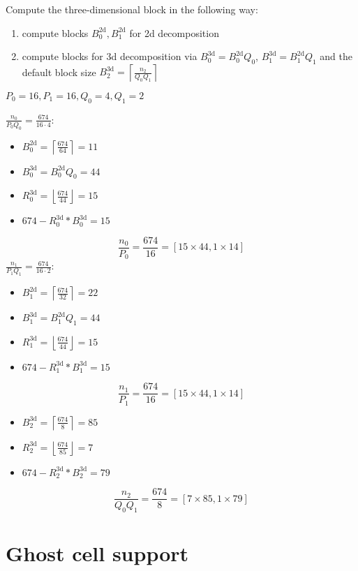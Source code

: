 Compute the three-dimensional block in the following way:
\begin{enumerate}
 \item compute blocks $B_0^\textrm{2d}, B_1^\textrm{2d}$ for 2d decomposition
 \item compute blocks for 3d decomposition via $B_0^\textrm{3d} = B_0^\textrm{2d} Q_0$, $B_1^\textrm{3d} = B_1^\textrm{2d} Q_1$ and the default block size $B_2^\textrm{3d} = \left\lceil\frac{n_2}{Q_0Q_1}\right\rceil$
\end{enumerate}


$P_0 = 16, P_1 = 16, Q_0=4, Q_1=2$

$\frac{n_0}{P_0Q_0} = \frac{674}{16\cdot 4}$:
\begin{itemize}
 \item $B_0^\textrm{2d} = \left\lceil \frac{674}{64} \right\rceil = 11$
 \item $B_0^\textrm{3d} = B_0^\textrm{2d}Q_0 = 44$
 \item $R_0^\textrm{3d} = \left\lfloor \frac{674}{44} \right\rfloor = 15$
 \item $674 - R_0^\textrm{3d}*B_0^\textrm{3d} = 15$
\end{itemize}
\begin{equation*}
  \frac{n_0}{P_0} = \frac{674}{16} = \left[15\times 44, 1\times 14 \right]
\end{equation*}
$\frac{n_1}{P_1Q_1} = \frac{674}{16\cdot 2}$:
\begin{itemize}
 \item $B_1^\textrm{2d} = \left\lceil \frac{674}{32} \right\rceil = 22$
 \item $B_1^\textrm{3d} = B_1^\textrm{2d}Q_1 = 44$
 \item $R_1^\textrm{3d} = \left\lfloor \frac{674}{44} \right\rfloor = 15$
 \item $674 - R_1^\textrm{3d}*B_1^\textrm{3d} = 15$
\end{itemize}
\begin{equation*}
  \frac{n_1}{P_1} = \frac{674}{16} = \left[15\times 44, 1\times 14 \right]
\end{equation*}

\begin{itemize}
 \item $B_2^\textrm{3d} = \left\lceil \frac{674}{8} \right\rceil = 85$
 \item $R_2^\textrm{3d} = \left\lfloor \frac{674}{85} \right\rfloor = 7$
 \item $674 - R_2^\textrm{3d}*B_2^\textrm{3d} = 79$
\end{itemize}
\begin{equation*}
  \frac{n_2}{Q_0Q_1} = \frac{674}{8} = \left[7\times 85, 1\times 79 \right]
\end{equation*}

\section{Ghost cell support}


